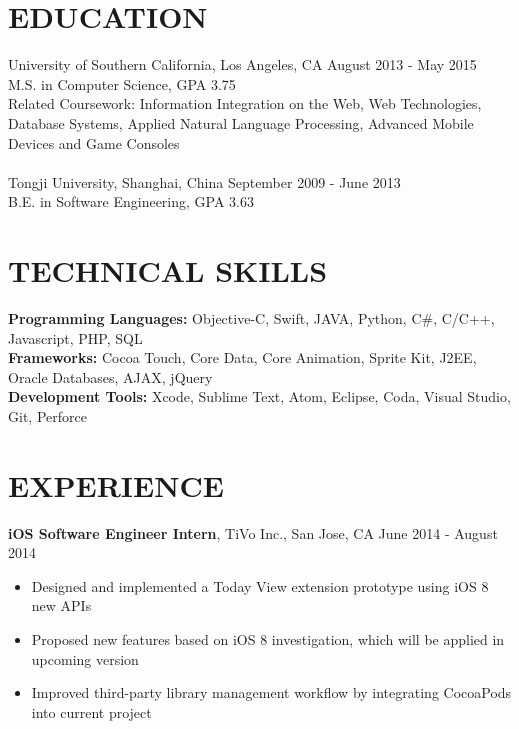\documentclass[line, overlapped]{res}
\begin{document}
\address{1133 W 36th Pl Apt 6, Los Angeles, CA 90007}
\address{(213) 806-0803, haishany@usc.edu, gitub.com/gabrielyeah}

\begin{resume}

\section{EDUCATION}
University of Southern California, Los Angeles, CA \hfill August 2013 - May 2015\\
M.S. in Computer Science, GPA 3.75\\
Related Coursework: Information Integration on the Web, Web Technologies, Database Systems, Applied Natural Language Processing,
Advanced Mobile Devices and Game Consoles\\
\\
Tongji University, Shanghai, China \hfill September 2009 - June 2013\\
B.E. in Software Engineering, GPA 3.63

\section{TECHNICAL SKILLS}
\textbf{Programming Languages:} Objective-C, Swift, JAVA, Python, C\#, C/C++, Javascript, PHP, SQL\\
\textbf{Frameworks:} Cocoa Touch, Core Data, Core Animation, Sprite Kit, J2EE, Oracle Databases, AJAX, jQuery\\
\textbf{Development Tools:} Xcode, Sublime Text, Atom, Eclipse, Coda, Visual Studio, Git, Perforce

\section{EXPERIENCE}

\textbf{iOS Software Engineer Intern}, TiVo Inc., San Jose, CA \hfill June 2014 - August 2014
 \begin{itemize} \itemsep -2pt
 
 \item Designed and implemented a Today View extension prototype using iOS 8 new APIs
 
 \item Proposed new features based on iOS 8 investigation, which will be applied in upcoming version
 
 \item Improved third-party library management workflow by integrating CocoaPods into current project
 

\end{itemize}
\end{resume}
\end{document}
